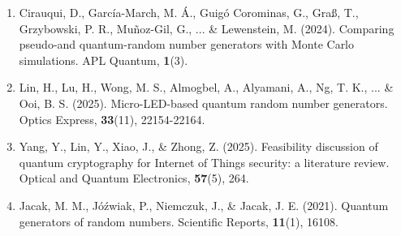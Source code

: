 \begin{talk}
\medskip

\begin{enumerate}
\item[{[1]}] Cirauqui, D., Garc\'ia-March, M. \'A., Guig\'o Corominas, G., Gra{\ss}, T., Grzybowski, P. R., Mu\~noz-Gil, G., ... \& Lewenstein, M. (2024). Comparing pseudo-and quantum-random number generators with Monte Carlo simulations. APL Quantum,  \textbf{1}(3).

\item[{[2]}]  Lin, H., Lu, H., Wong, M. S., Almogbel, A., Alyamani, A., Ng, T. K., ... \& Ooi, B. S. (2025). Micro-LED-based quantum random number generators. Optics Express, \textbf{33}(11), 22154-22164.

\item[{[3]}]  Yang, Y., Lin, Y., Xiao, J., \& Zhong, Z. (2025). Feasibility discussion of quantum cryptography for Internet of Things security: a literature review. Optical and Quantum Electronics, \textbf{57}(5), 264.

\item [{[4]}]  Jacak, M. M., J\'oźwiak, P., Niemczuk, J., \& Jacak, J. E. (2021). Quantum generators of random numbers. Scientific Reports, \textbf{11}(1), 16108.
\end{enumerate}

\end{talk}


